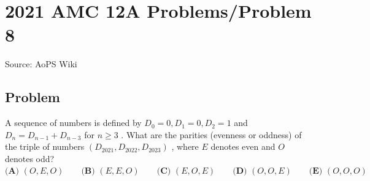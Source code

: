 \documentclass[12pt]{article}
\begin{document}
\section*{{2021 AMC 12A Problems/Problem 8}}
Source: AoPS Wiki

\subsection*{Problem}
A sequence of numbers is defined by $D_0=0,D_1=0,D_2=1$ and $D_n=D_{n-1}+D_{n-3}$ for $n\ge 3$ . What are the parities (evenness or oddness) of the triple of numbers $(D_{2021},D_{2022},D_{2023})$ , where $E$ denotes even and $O$ denotes odd? $\textbf{(A) }(O,E,O) \qquad \textbf{(B) }(E,E,O) \qquad \textbf{(C) }(E,O,E) \qquad \textbf{(D) }(O,O,E) \qquad \textbf{(E) }(O,O,O)$
\end{document}
